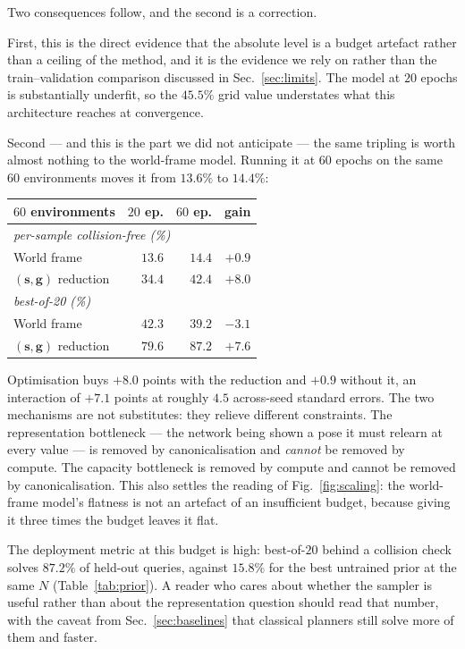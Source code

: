 \documentclass[10pt,twocolumn,letterpaper]{article}
\newcommand{\toprule}{\hline}
\newcommand{\midrule}{\hline}
\newcommand{\bottomrule}{\hline}
\theoremstyle{plain}
\newcommand{\svec}{\mathbf{s}}
\newcommand{\gvec}{\mathbf{g}}
\begin{document}
Two consequences follow, and the second is a correction.

First, this is the direct evidence that the absolute level is a budget artefact
rather than a ceiling of the method, and it is the evidence we rely on rather
than the train--validation comparison discussed in Sec.~\ref{sec:limits}. The
model at $20$ epochs is substantially underfit, so the $45.5\%$ grid value
understates what this architecture reaches at convergence.

Second --- and this is the part we did not anticipate --- the same tripling is
worth almost nothing to the world-frame model. Running it at $60$ epochs on the
same $60$ environments moves it from $13.6\%$ to $14.4\%$:
\begin{center}\small
\begin{tabular}{lrrr}
\toprule
$60$ environments & $20$ ep. & $60$ ep. & gain \\
\midrule
\multicolumn{4}{l}{\emph{per-sample collision-free (\%)}}\\
World frame            & $13.6$ & $14.4$ & $+0.9$ \\
$(\svec,\gvec)$ reduction & $34.4$ & $\mathbf{42.4}$ & $+8.0$ \\[2pt]
\multicolumn{4}{l}{\emph{best-of-20 (\%)}}\\
World frame            & $42.3$ & $39.2$ & $-3.1$ \\
$(\svec,\gvec)$ reduction & $79.6$ & $\mathbf{87.2}$ & $+7.6$ \\
\bottomrule
\end{tabular}
\end{center}
Optimisation buys $+8.0$ points with the reduction and $+0.9$ without it, an
interaction of $+7.1$ points at roughly $4.5$ across-seed standard errors. The
two mechanisms are not substitutes: they relieve different constraints. The
representation bottleneck --- the network being shown a pose it must relearn at
every value --- is removed by canonicalisation and \emph{cannot} be removed by
compute. The capacity bottleneck is removed by compute and cannot be removed by
canonicalisation. This also settles the reading of Fig.~\ref{fig:scaling}: the
world-frame model's flatness is not an artefact of an insufficient budget, because
giving it three times the budget leaves it flat.

The deployment metric at this budget is high: best-of-$20$ behind a collision
check solves $\mathbf{87.2\%}$ of held-out queries, against $15.8\%$ for the best
untrained prior at the same $N$ (Table~\ref{tab:prior}). A reader who cares about
whether the sampler is useful rather than about the representation question
should read that number, with the caveat from Sec.~\ref{sec:baselines} that
classical planners still solve more of them and faster.
\end{document}
